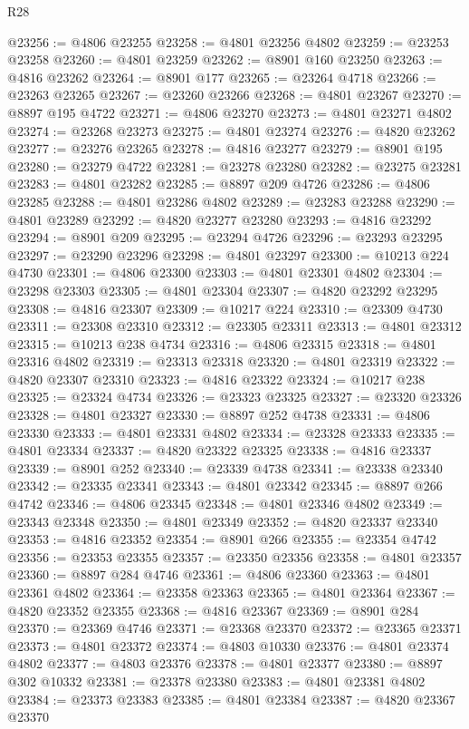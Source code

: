 \begin{lexlean}{R28}
\begin{coremodule}
@23256 := @4806 @23255
@23258 := @4801 @23256 @4802
@23259 := @23253 @23258
@23260 := @4801 @23259
@23262 := @8901 @160 @23250
@23263 := @4816 @23262
@23264 := @8901 @177
@23265 := @23264 @4718
@23266 := @23263 @23265
@23267 := @23260 @23266
@23268 := @4801 @23267
@23270 := @8897 @195 @4722
@23271 := @4806 @23270
@23273 := @4801 @23271 @4802
@23274 := @23268 @23273
@23275 := @4801 @23274
@23276 := @4820 @23262
@23277 := @23276 @23265
@23278 := @4816 @23277
@23279 := @8901 @195
@23280 := @23279 @4722
@23281 := @23278 @23280
@23282 := @23275 @23281
@23283 := @4801 @23282
@23285 := @8897 @209 @4726
@23286 := @4806 @23285
@23288 := @4801 @23286 @4802
@23289 := @23283 @23288
@23290 := @4801 @23289
@23292 := @4820 @23277 @23280
@23293 := @4816 @23292
@23294 := @8901 @209
@23295 := @23294 @4726
@23296 := @23293 @23295
@23297 := @23290 @23296
@23298 := @4801 @23297
@23300 := @10213 @224 @4730
@23301 := @4806 @23300
@23303 := @4801 @23301 @4802
@23304 := @23298 @23303
@23305 := @4801 @23304
@23307 := @4820 @23292 @23295
@23308 := @4816 @23307
@23309 := @10217 @224
@23310 := @23309 @4730
@23311 := @23308 @23310
@23312 := @23305 @23311
@23313 := @4801 @23312
@23315 := @10213 @238 @4734
@23316 := @4806 @23315
@23318 := @4801 @23316 @4802
@23319 := @23313 @23318
@23320 := @4801 @23319
@23322 := @4820 @23307 @23310
@23323 := @4816 @23322
@23324 := @10217 @238
@23325 := @23324 @4734
@23326 := @23323 @23325
@23327 := @23320 @23326
@23328 := @4801 @23327
@23330 := @8897 @252 @4738
@23331 := @4806 @23330
@23333 := @4801 @23331 @4802
@23334 := @23328 @23333
@23335 := @4801 @23334
@23337 := @4820 @23322 @23325
@23338 := @4816 @23337
@23339 := @8901 @252
@23340 := @23339 @4738
@23341 := @23338 @23340
@23342 := @23335 @23341
@23343 := @4801 @23342
@23345 := @8897 @266 @4742
@23346 := @4806 @23345
@23348 := @4801 @23346 @4802
@23349 := @23343 @23348
@23350 := @4801 @23349
@23352 := @4820 @23337 @23340
@23353 := @4816 @23352
@23354 := @8901 @266
@23355 := @23354 @4742
@23356 := @23353 @23355
@23357 := @23350 @23356
@23358 := @4801 @23357
@23360 := @8897 @284 @4746
@23361 := @4806 @23360
@23363 := @4801 @23361 @4802
@23364 := @23358 @23363
@23365 := @4801 @23364
@23367 := @4820 @23352 @23355
@23368 := @4816 @23367
@23369 := @8901 @284
@23370 := @23369 @4746
@23371 := @23368 @23370
@23372 := @23365 @23371
@23373 := @4801 @23372
@23374 := @4803 @10330
@23376 := @4801 @23374 @4802
@23377 := @4803 @23376
@23378 := @4801 @23377
@23380 := @8897 @302 @10332
@23381 := @23378 @23380
@23383 := @4801 @23381 @4802
@23384 := @23373 @23383
@23385 := @4801 @23384
@23387 := @4820 @23367 @23370

\end{coremodule}
\end{lexlean}
